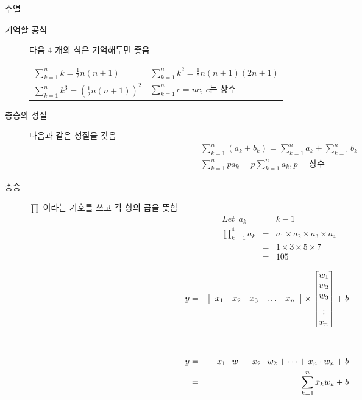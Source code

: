 \documentclass[10pt,t]{beamer}
\begin{document}
\begin{frame}{수열}
\begin{description}
  \item[기억할 공식] 다음 4 개의 식은 기억해두면 좋음\\[2em]
    \begin{tabular}[h]{l l}
      $\sum_{k=1}^n k = \frac{1}{2}n(n+1)$ & $\sum_{k=1}^n k^2 = \frac{1}{6}n(n+1)(2n+1)$ \\[2em]
      $\sum_{k=1}^n k^3 = \left(\frac{1}{2}n(n+1)\right)^2$ & $\sum_{k=1}^n c = nc$, $c$는 상수 \\[2em]
    \end{tabular}
  \item[총승의 성질] 다음과 같은 성질을 갖음\\
    \begin{eqnarray*}
      \sum_{k=1}^n (a_k + b_k) = \sum_{k=1}^n a_k + \sum_{k=1}^n b_k \\
      \sum_{k=1}^n pa_k = p\sum_{k=1}^n a_k, p = 상수
    \end{eqnarray*}
  \item[총승] $\prod$ 이라는 기호를 쓰고 각 항의 곱을 뜻함\\
    \begin{eqnarray*}
    Let~~ a_k &=& k-1 \\
      \prod_{k=1}^4 a_k &=& a_1 \times a_2 \times a_3 \times a_4 \\
      &=& 1 \times 3 \times 5\times 7 \\
      &=& 105
    \end{eqnarray*}
  \end{description}
\pagebreak
\begin{eqnarray*}
    y &=& 
    \left[
      \begin{array}{c c c c c }
         x_1  & x_2 & x_3 & \ldots & x_n
      \end{array}
    \right] \times
    \begin{bmatrix}
               w_{1} \\
               w_{2} \\
               w_{3} \\
               \vdots \\
               x_{n}
             \end{bmatrix} +b    \\[3em]
y & = &  x_1 \cdot w_1 + x_2 \cdot w_2 + \cdots + x_n\cdot w_n + b\\
&=& \sum _{k=1}^ n x_k w_k + b   
\end{eqnarray*}

\end{frame}
  
\end{document}
